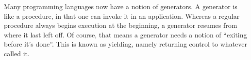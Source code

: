 
Many programming languages now have a notion of generators. A generator is like
a procedure, in that one can invoke it in an application. Whereas a regular
procedure always begins execution at the beginning, a generator resumes from
where it last left off. Of course, that means a generator needs a notion of
“exiting before it’s done”. This is known as yielding, namely returning control
to whatever called it.

\secdown


\secup
